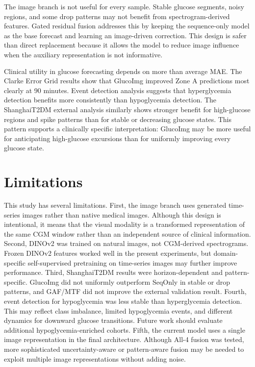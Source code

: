 \documentclass[11pt]{article}
\begin{document}
The image branch is not useful for every sample. Stable glucose segments, noisy regions, and some drop patterns may not benefit from spectrogram-derived features. Gated residual fusion addresses this by keeping the sequence-only model as the base forecast and learning an image-driven correction. This design is safer than direct replacement because it allows the model to reduce image influence when the auxiliary representation is not informative.

Clinical utility in glucose forecasting depends on more than average MAE. The Clarke Error Grid results show that GlucoImg improved Zone A predictions most clearly at 90 minutes. Event detection analysis suggests that hyperglycemia detection benefits more consistently than hypoglycemia detection. The ShanghaiT2DM external analysis similarly shows stronger benefit for high-glucose regions and spike patterns than for stable or decreasing glucose states. This pattern supports a clinically specific interpretation: GlucoImg may be more useful for anticipating high-glucose excursions than for uniformly improving every glucose state.

\section{Limitations}

This study has several limitations. First, the image branch uses generated time-series images rather than native medical images. Although this design is intentional, it means that the visual modality is a transformed representation of the same CGM window rather than an independent source of clinical information. Second, DINOv2 was trained on natural images, not CGM-derived spectrograms. Frozen DINOv2 features worked well in the present experiments, but domain-specific self-supervised pretraining on time-series images may further improve performance. Third, ShanghaiT2DM results were horizon-dependent and pattern-specific. GlucoImg did not uniformly outperform SeqOnly in stable or drop patterns, and GAF/MTF did not improve the external validation result. Fourth, event detection for hypoglycemia was less stable than hyperglycemia detection. This may reflect class imbalance, limited hypoglycemia events, and different dynamics for downward glucose transitions. Future work should evaluate additional hypoglycemia-enriched cohorts. Fifth, the current model uses a single image representation in the final architecture. Although All-4 fusion was tested, more sophisticated uncertainty-aware or pattern-aware fusion may be needed to exploit multiple image representations without adding noise.
\end{document}
